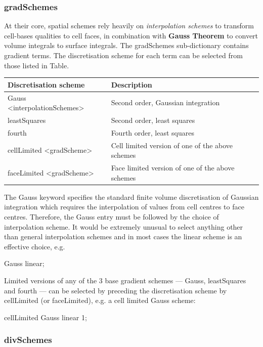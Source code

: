 \documentclass{article}
\begin{document}
\subsubsection{gradSchemes}

At their core, spatial schemes rely heavily on \textit{interpolation schemes} to transform cell-bases qualities to cell faces, in combination with \textbf{Gauss Theorem} to convert volume integrals to surface integrals. The gradSchemes sub-dictionary contains gradient terms. The discretisation scheme for each term can be selected from those listed in Table. 

\begin{tabular}{l | l}
\hline
Discretisation scheme	 &  Description \\
\hline 
Gauss <interpolationSchemes> & Second order, Gaussian integration \\
leastSquares   & Second order, least squares \\
fourth	 & Fourth order, least squares \\
cellLimited <gradScheme>  & 	Cell limited version of one of the above schemes \\
faceLimited <gradScheme> &	Face limited version of one of the above schemes \\
\hline
\end{tabular}

The Gauss keyword specifies the standard finite volume discretisation of Gaussian integration which requires the interpolation of values from cell centres to face centres. Therefore, the Gauss entry must be followed by the choice of interpolation scheme. It would be extremely unusual to select anything other than general interpolation schemes and in most cases the linear scheme is an effective choice, e.g. 

Gauss linear;  

Limited versions of any of the 3 base gradient schemes — Gauss, leastSquares and fourth — can be selected by preceding the discretisation scheme by cellLimited (or faceLimited), e.g. a cell limited Gauss scheme: 

cellLimited Gauss linear 1;

\subsubsection{divSchemes}
\end{document}
